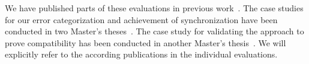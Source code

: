 We have published parts of these evaluations in previous work~. The case studies for our error categorization and achievement of synchronization have been conducted in two Master's theses~. The case study for validating the approach to prove compatibility has been conducted in another Master's thesis~. We will explicitly refer to the according publications in the individual evaluations.





